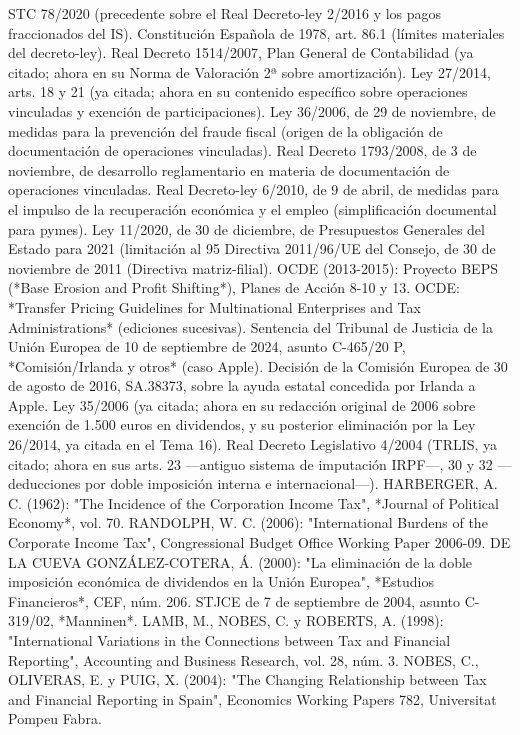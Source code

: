 \documentclass[10pt,a4paper]{article}
\begin{document}
STC 78/2020 (precedente sobre el Real Decreto-ley 2/2016 y los pagos fraccionados del IS).
Constitución Española de 1978, art. 86.1 (límites materiales del decreto-ley).
Real Decreto 1514/2007, Plan General de Contabilidad (ya citado; ahora en su Norma de Valoración 2ª sobre amortización).
Ley 27/2014, arts. 18 y 21 (ya citada; ahora en su contenido específico sobre operaciones vinculadas y exención de participaciones).
Ley 36/2006, de 29 de noviembre, de medidas para la prevención del fraude fiscal (origen de la obligación de documentación de operaciones vinculadas).
Real Decreto 1793/2008, de 3 de noviembre, de desarrollo reglamentario en materia de documentación de operaciones vinculadas.
Real Decreto-ley 6/2010, de 9 de abril, de medidas para el impulso de la recuperación económica y el empleo (simplificación documental para pymes).
Ley 11/2020, de 30 de diciembre, de Presupuestos Generales del Estado para 2021 (limitación al 95%
Directiva 2011/96/UE del Consejo, de 30 de noviembre de 2011 (Directiva matriz-filial).
OCDE (2013-2015): Proyecto BEPS (*Base Erosion and Profit Shifting*), Planes de Acción 8-10 y 13.
OCDE: *Transfer Pricing Guidelines for Multinational Enterprises and Tax Administrations* (ediciones sucesivas).
Sentencia del Tribunal de Justicia de la Unión Europea de 10 de septiembre de 2024, asunto C-465/20 P, *Comisión/Irlanda y otros* (caso Apple).
Decisión de la Comisión Europea de 30 de agosto de 2016, SA.38373, sobre la ayuda estatal concedida por Irlanda a Apple.
Ley 35/2006 (ya citada; ahora en su redacción original de 2006 sobre exención de 1.500 euros en dividendos, y su posterior eliminación por la Ley 26/2014, ya citada en el Tema 16).
Real Decreto Legislativo 4/2004 (TRLIS, ya citado; ahora en sus arts. 23 —antiguo sistema de imputación IRPF—, 30 y 32 —deducciones por doble imposición interna e internacional—).
HARBERGER, A. C. (1962): "The Incidence of the Corporation Income Tax", *Journal of Political Economy*, vol. 70.
RANDOLPH, W. C. (2006): "International Burdens of the Corporate Income Tax", Congressional Budget Office Working Paper 2006-09.
DE LA CUEVA GONZÁLEZ-COTERA, Á. (2000): "La eliminación de la doble imposición económica de dividendos en la Unión Europea", *Estudios Financieros*, CEF, núm. 206.
STJCE de 7 de septiembre de 2004, asunto C-319/02, *Manninen*.
LAMB, M., NOBES, C. y ROBERTS, A. (1998): "International Variations in the Connections between Tax and Financial Reporting", Accounting and Business Research, vol. 28, núm. 3.
NOBES, C., OLIVERAS, E. y PUIG, X. (2004): "The Changing Relationship between Tax and Financial Reporting in Spain", Economics Working Papers 782, Universitat Pompeu Fabra.
\end{document}
